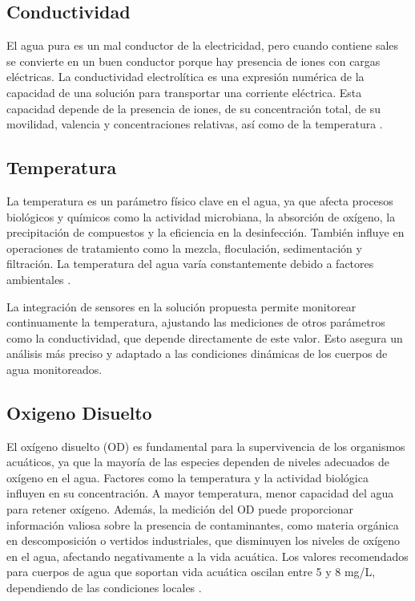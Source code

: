 \subsection{Conductividad}
El agua pura es un mal conductor de la electricidad, pero cuando contiene sales se convierte en un buen conductor porque hay presencia de iones con cargas eléctricas. La conductividad electrolítica es una expresión numérica de la capacidad de una solución para transportar una corriente eléctrica. Esta capacidad depende de la presencia de iones, de su concentración total, de su movilidad, valencia y concentraciones relativas, así como de la temperatura \cite{nmx2000}.

\subsection{Temperatura}
La temperatura es un parámetro físico clave en el agua, ya que afecta procesos biológicos y químicos como la actividad microbiana, la absorción de oxígeno, la precipitación de compuestos y la eficiencia en la desinfección. También influye en operaciones de tratamiento como la mezcla, floculación, sedimentación y filtración. La temperatura del agua varía constantemente debido a factores ambientales \cite{uno2020}.

La integración de sensores en la solución propuesta permite monitorear continuamente la temperatura, ajustando las mediciones de otros parámetros como la conductividad, que depende directamente de este valor. Esto asegura un análisis más preciso y adaptado a las condiciones dinámicas de los cuerpos de agua monitoreados.

\subsection{Oxigeno Disuelto}
El oxígeno disuelto (OD) es fundamental para la supervivencia de los organismos acuáticos, ya que la mayoría de las especies dependen de niveles adecuados de oxígeno en el agua. Factores como la temperatura y la actividad biológica influyen en su concentración. A mayor temperatura, menor capacidad del agua para retener oxígeno. Además, la medición del OD puede proporcionar información valiosa sobre la presencia de contaminantes, como materia orgánica en descomposición o vertidos industriales, que disminuyen los niveles de oxígeno en el agua, afectando negativamente a la vida acuática. Los valores recomendados para cuerpos de agua que soportan vida acuática oscilan entre 5 y 8 mg/L, dependiendo de las condiciones locales \cite{swamp2023}.


